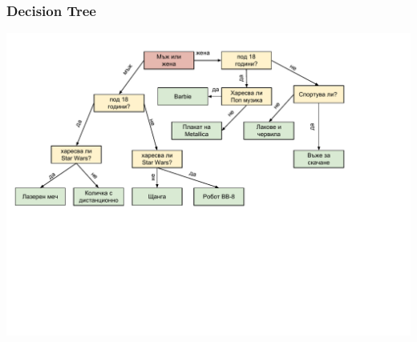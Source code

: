 \documentclass{beamer}
\begin{document}
\begin{frame}[fragile]
  \frametitle{Decision Tree}
  
  \includegraphics[width=14cm]{images/tree_decision}
  
  \end{frame}
  

\end{document}
